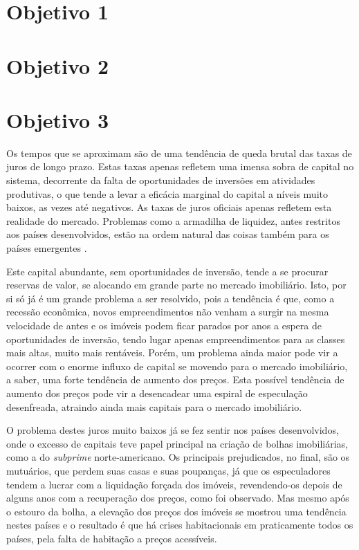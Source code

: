 \documentclass[
	12pt,				%
	oneside,			%
	a4paper,			%
	chapter=TITLE,		%
	section=TITLE,		%
	english,			%
	brazil				%
	]{abntex2}
\begin{document}
\begin{refsection}
{\section{Objetivo 1}\label{objetivo-1}}

\hypertarget{objetivo-2}{%
\section{Objetivo 2}\label{objetivo-2}}

\hypertarget{objetivo-3}{%
\section{Objetivo 3}\label{objetivo-3}}

Os tempos que se aproximam são de uma tendência de queda brutal das taxas de
juros de longo prazo. Estas taxas apenas refletem uma imensa sobra de capital no
sistema, decorrente da falta de oportunidades de inversões em atividades
produtivas, o que tende a levar a eficácia marginal do capital a níveis muito
baixos, as vezes até negativos. As taxas de juros oficiais apenas refletem esta
realidade do mercado. Problemas como a armadilha de liquidez, antes restritos
aos países desenvolvidos, estão na ordem natural das coisas também para os
países emergentes \autocite{krugman-emergentes}.

Este capital abundante, sem oportunidades de inversão, tende a se procurar
reservas de valor, se alocando em grande parte no mercado imobiliário. Isto, por
si só já é um grande problema a ser resolvido, pois a tendência é que, como a
recessão econômica, novos empreendimentos não venham a surgir na mesma
velocidade de antes e os imóveis podem ficar parados por anos a espera de
oportunidades de inversão, tendo lugar apenas empreendimentos para as classes
mais altas, muito mais rentáveis. Porém, um problema ainda maior pode vir a
ocorrer com o enorme influxo de capital se movendo para o mercado imobiliário, a
saber, uma forte tendência de aumento dos preços. Esta possível tendência de
aumento dos preços pode vir a desencadear uma espiral de especulação
desenfreada, atraindo ainda mais capitais para o mercado imobiliário.

O problema destes juros muito baixos já se fez sentir nos países desenvolvidos,
onde o excesso de capitais teve papel principal na criação de bolhas
imobiliárias, como a do \emph{subprime} norte-americano. Os principais prejudicados,
no final, são os mutuários, que perdem suas casas e suas poupanças, já que os
especuladores tendem a lucrar com a liquidação forçada dos imóveis,
revendendo-os depois de alguns anos com a recuperação dos preços, como foi
observado. Mas mesmo após o estouro da bolha, a elevação dos preços dos imóveis
se mostrou uma tendência nestes países e o resultado é que há crises
habitacionais em praticamente todos os países, pela falta de habitação a preços
acessíveis.


\end{refsection}
\end{document}
